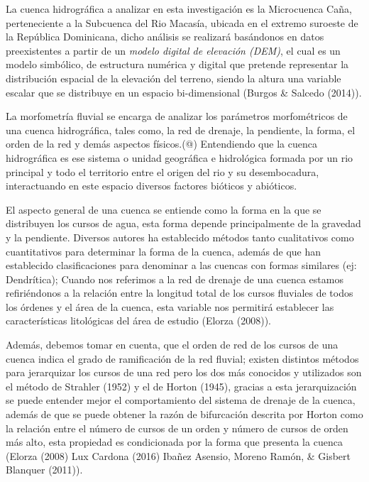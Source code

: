 \documentclass[11pt,]{article}
\begin{document}
La cuenca hidrográfica a analizar en esta investigación es la
Microcuenca Caña, perteneciente a la Subcuenca del Rio Macasía, ubicada
en el extremo suroeste de la República Dominicana, dicho análisis se
realizará basándonos en datos preexistentes a partir de un \emph{modelo
digital de elevación (DEM)}, el cual es un modelo simbólico, de
estructura numérica y digital que pretende representar la distribución
espacial de la elevación del terreno, siendo la altura una variable
escalar que se distribuye en un espacio bi-dimensional (Burgos \&
Salcedo (2014)).

La morfometría fluvial se encarga de analizar los parámetros
morfométricos de una cuenca hidrográfica, tales como, la red de drenaje,
la pendiente, la forma, el orden de la red y demás aspectos físicos.(@)
Entendiendo que la cuenca hidrográfica es ese sistema o unidad
geográfica e hidrológica formada por un rio principal y todo el
territorio entre el origen del rio y su desembocadura, interactuando en
este espacio diversos factores bióticos y abióticos.

El aspecto general de una cuenca se entiende como la forma en la que se
distribuyen los cursos de agua, esta forma depende principalmente de la
gravedad y la pendiente. Diversos autores ha establecido métodos tanto
cualitativos como cuantitativos para determinar la forma de la cuenca,
además de que han establecido clasificaciones para denominar a las
cuencas con formas similares (ej: Dendrítica); Cuando nos referimos a la
red de drenaje de una cuenca estamos refiriéndonos a la relación entre
la longitud total de los cursos fluviales de todos los órdenes y el área
de la cuenca, esta variable nos permitirá establecer las características
litológicas del área de estudio (Elorza (2008)).

Además, debemos tomar en cuenta, que el orden de red de los cursos de
una cuenca indica el grado de ramificación de la red fluvial; existen
distintos métodos para jerarquizar los cursos de una red pero los dos
más conocidos y utilizados son el método de Strahler (1952) y el de
Horton (1945), gracias a esta jerarquización se puede entender mejor el
comportamiento del sistema de drenaje de la cuenca, además de que se
puede obtener la razón de bifurcación descrita por Horton como la
relación entre el número de cursos de un orden y número de cursos de
orden más alto, esta propiedad es condicionada por la forma que presenta
la cuenca (Elorza (2008) Lux Cardona (2016) Ibañez Asensio, Moreno
Ramón, \& Gisbert Blanquer (2011)).
\end{document}
